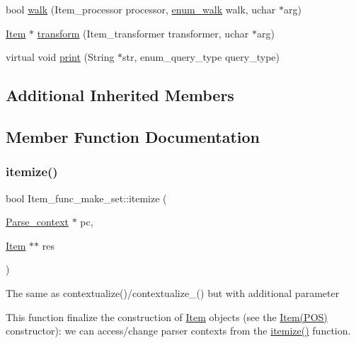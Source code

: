 \begin{DoxyCompactItemize}
\item 
bool \mbox{\hyperlink{classItem__func__make__set_a75791f36ac076834fdd42c7081d8d763}{walk}} (Item\+\_\+processor processor, \mbox{\hyperlink{classItem_a4e68f315ba2a26543339e9f0efed3695}{enum\+\_\+walk}} walk, uchar $\ast$arg)
\item 
\mbox{\hyperlink{classItem}{Item}} $\ast$ \mbox{\hyperlink{classItem__func__make__set_a7f76c6a1bd0ad1f4ecfc30eaa0165d21}{transform}} (Item\+\_\+transformer transformer, uchar $\ast$arg)
\item 
virtual void \mbox{\hyperlink{classItem__func__make__set_a906cb74c980690ae9a7c767d111da188}{print}} (String $\ast$str, enum\+\_\+query\+\_\+type query\+\_\+type)
\end{DoxyCompactItemize}
\subsection*{Additional Inherited Members}


\subsection{Member Function Documentation}
\mbox{\label{classItem__func__make__set_a5b2e80cd013122c3a7bed4582b75456f}} 
\subsubsection{\texorpdfstring{itemize()}{itemize()}}
{\footnotesize\ttfamily bool Item\+\_\+func\+\_\+make\+\_\+set\+::itemize (\begin{DoxyParamCaption}\item[{\mbox{\hyperlink{structParse__context}{Parse\+\_\+context}} $\ast$}]{pc,  }\item[{\mbox{\hyperlink{classItem}{Item}} $\ast$$\ast$}]{res }\end{DoxyParamCaption})\hspace{0.3cm}{\ttfamily [virtual]}}

The same as contextualize()/contextualize\+\_\+() but with additional parameter

This function finalize the construction of \mbox{\hyperlink{classItem}{Item}} objects (see the \mbox{\hyperlink{classItem}{Item(\+P\+O\+S)}} constructor)\+: we can access/change parser contexts from the \mbox{\hyperlink{classItem__func__make__set_a5b2e80cd013122c3a7bed4582b75456f}{itemize()}} function.


